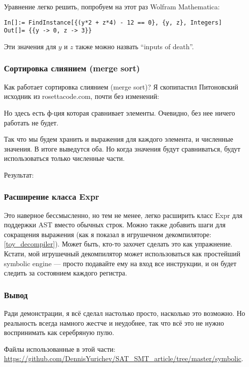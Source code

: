 Уравнение легко решить, попробуем на этот раз Wolfram Mathematica:

\begin{lstlisting}
In[]:= FindInstance[{(y*2 + z*4) - 12 == 0}, {y, z}, Integers]
Out[]= {{y -> 0, z -> 3}}
\end{lstlisting}

Эти значения для $y$ и $z$ также можно назвать ``inputs of death''.

\subsubsection{Сортировка слиянием (merge sort)}

Как работает сортировка слиянием (merge sort)?
Я скопипастил Питоновский исходник из rosettacode.com, почти без изменений:



Но здесь есть ф-ция которая сравнивает элементы.
Очевидно, без нее ничего работать не будет.

Так что мы будем хранить и выражения для каждого элемента, и численные значения.
В итоге выведутся оба.
Но когда значения будут сравниваться, будут использоваться только численные части.

Результат:



\subsubsection{Расширение класса Expr}

Это наверное бессмысленно, но тем не менее, легко расширить класс Expr для поддержки \ac{AST} вместо обычных строк.
Можно также добавить шаги для сокращения выражения (как я показал в игрушечном декомпиляторе: \ref{toy_decompiler}).
Может быть, кто-то захочет сделать это как упражнение.
Кстати, мой игрушечный декомпилятор может использоваться как простейший symbolic engine --- просто подавайте ему на вход
все инструкции, и он будет следить за состоянием каждого регистра.

\subsubsection{Вывод}

Ради демонстрации, я всё сделал настолько просто, насколько это возможно.
Но реальность всегда намного жестче и неудобнее, так что всё это не нужно воспринимать как серебряную пулю.

Файлы использованные в этой части: \url{https://github.com/DennisYurichev/SAT_SMT_article/tree/master/symbolic}.

